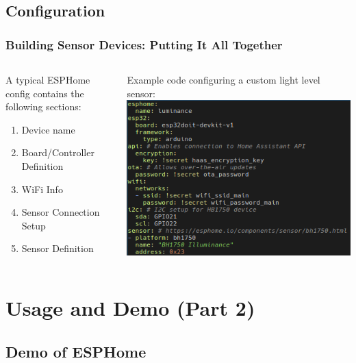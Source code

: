 \documentclass[aspectratio=169]{beamer}
\begin{document}
\subsection{Configuration}
\begin{frame}[fragile]
  \frametitle{Building Sensor Devices: Putting It All Together}
  \begin{columns}[]
    \begin{column}[T]{0.45\paperwidth}
      A typical ESPHome config contains the following sections:
      \begin{enumerate}%
        \item{Device name}
        \item{Board/Controller Definition}
        \item{WiFi Info}
        \item{Sensor Connection Setup}
        \item{Sensor Definition}
      \end{enumerate}
    \end{column}
    \begin{column}[T]{0.45\paperwidth}
      Example code configuring a custom light level sensor:
      \includegraphics[width=0.45\paperwidth,keepaspectratio]{images/luminance.png}
    \end{column}
  \end{columns}
\end{frame}

\section{Usage and Demo (Part 2)}
\subsection{Demo of ESPHome}
\frame{\subsectionpage}
\end{document}
